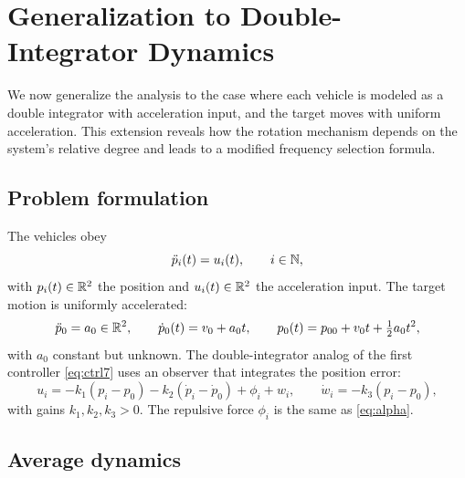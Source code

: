 \section{Generalization to Double-Integrator Dynamics}
\label{sec:double}

We now generalize the analysis to the case where each vehicle is modeled as a double integrator
with acceleration input, and the target moves with uniform acceleration. This extension reveals
how the rotation mechanism depends on the system's relative degree and leads to a modified
frequency selection formula.

\subsection{Problem formulation}
\label{sec:double_setup}

The vehicles obey
\begin{equation}
  \ddot{p}_i(t)=u_i(t),\qquad i\in\mathbb{N},
  \label{eq:double_veh}
\end{equation}
with $p_i(t)\in\mathbb{R}^2$ the position and $u_i(t)\in\mathbb{R}^2$ the acceleration input. The target motion is
uniformly accelerated:
\begin{equation}
  \ddot{p}_0=a_0\in\mathbb{R}^2,\qquad\dot{p}_0(t)=v_0+a_0t,\qquad p_0(t)=p_{00}+v_0t+\tfrac12 a_0t^2,
  \label{eq:double_tgt}
\end{equation}
with $a_0$ constant but unknown. The double-integrator analog of the first controller \eqref{eq:ctrl7}
uses an observer that integrates the position error:
\begin{equation}
  \boxed{\; u_i=-k_1(p_i-p_0)-k_2(\dot{p}_i-\dot{p}_0)+\phi_i+w_i,\qquad
  \dot{w}_i=-k_3(p_i-p_0),\;}
  \label{eq:double_ctrl}
\end{equation}
with gains $k_1,k_2,k_3>0$. The repulsive force $\phi_i$ is the same as \eqref{eq:alpha}.

\subsection{Average dynamics}
\label{sec:double_avg}

